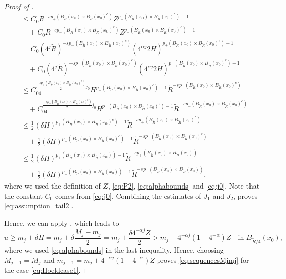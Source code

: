 \documentclass[11pt]{amsart}
\theoremstyle{plain}
\theoremstyle{definition}
\numberwithin{equation}{section}
\begin{document}
\begin{proof} [Proof of ]
\begin{equation}
\begin{aligned}
& \leq C_0R^{-sp_{+}(B_{\widetilde{R}}(x_0)\times B_{\widetilde{R}}(x_0)^c)}Z^{p_{+}(B_{\widetilde{R}}(x_0)\times B_{\widetilde{R}}(x_0)^c)-1} \\
& \quad + C_0R^{-sp_{-}(B_{\widetilde{R}}(x_0)\times B_{\widetilde{R}}(x_0)^c)}Z^{p_{-}(B_{\widetilde{R}}(x_0)\times B_{\widetilde{R}}(x_0)^c)-1} \\
& =C_0(4^{j}\widetilde{R})^{-sp_{+}(B_{\widetilde{R}}(x_0)\times B_{\widetilde{R}}(x_0)^c)}(4^{\alpha j}2H)^{p_{+}(B_{\widetilde{R}}(x_0)\times B_{\widetilde{R}}(x_0)^c)-1} \\
& \quad + C_0(4^{j}\widetilde{R})^{-sp_{-}(B_{\widetilde{R}}(x_0)\times B_{\widetilde{R}}(x_0)^c)}(4^{\alpha j}2H)^{p_{-}(B_{\widetilde{R}}(x_0)\times B_{\widetilde{R}}(x_0)^c)-1} \\
& \leq C_04^{\frac{-sp_{+}(B_{\widetilde{R}}(x_0)\times B_{\widetilde{R}}(x_0)^c)}{2}j_0}H^{p_{+}(B_{\widetilde{R}}(x_0)\times B_{\widetilde{R}}(x_0)^c)-1}\widetilde{R}^{-sp_{+}(B_{\widetilde{R}}(x_0)\times B_{\widetilde{R}}(x_0)^c)} \\
& \quad +C_04^{\frac{-sp_{-}(B_{\widetilde{R}}(x_0)\times B_{\widetilde{R}}(x_0)^c)}{2}j_0}H^{p_{-}(B_{\widetilde{R}}(x_0)\times B_{\widetilde{R}}(x_0)^c)-1}\widetilde{R}^{-sp_{-}(B_{\widetilde{R}}(x_0)\times B_{\widetilde{R}}(x_0)^c)} \\
& \leq \frac{1}{2}(\delta H)^{p_+(B_{\widetilde{R}}(x_0)\times B_{\widetilde{R}}(x_0)^c) - 1} \widetilde{R}^{-sp_+(B_{\widetilde{R}}(x_0)\times B_{\widetilde{R}}(x_0)^c)}\\
&\quad + \frac{1}{2}(\delta H)^{p_-(B_{\widetilde{R}}(x_0)\times B_{\widetilde{R}}(x_0)^c)-1} \widetilde{R}^{-sp_-(B_{\widetilde{R}}(x_0)\times B_{\widetilde{R}}(x_0)^c)} \\
& \leq \frac{1}{2}(\delta H)^{p_+(B_{\widetilde{R}}(x_0)\times B_{\widetilde{R}}(x_0)) - 1} \widetilde{R}^{-sp_+(B_{\widetilde{R}}(x_0)\times B_{\widetilde{R}}(x_0))} \\
&\quad +\frac{1}{2}(\delta H)^{p_-(B_{\widetilde{R}}(x_0)\times B_{\widetilde{R}}(x_0))-1} \widetilde{R}^{-sp_-(B_{\widetilde{R}}(x_0)\times B_{\widetilde{R}}(x_0))},
\end{aligned}
\end{equation}
where we used the definition of $Z$, \eqref{eq:P2}, \eqref{eq:alphabounds} and \eqref{eq:j0}. 
Note that the constant $C_0$ comes from \eqref{eq:j0}. Combining the estimates of $J_1$ and $J_2$, proves \eqref{eq:assumption_tail2}.

Hence, we can apply , which leads to
\[ u\geq m_j+\delta H = m_j+\delta \frac{M_{j}-m_j}{2} = m_j + \frac{\delta 4^{-\alpha j}Z}{2} > m_j+4^{-\alpha j}(1-4^{-\alpha})Z \quad \text{in } B_{\widetilde{R}/4}(x_0), \]
where we used \eqref{eq:alphabounds} in the last inequality. 
Hence, choosing $M_{j+1} = M_j$ and $m_{j+1}=m_j+4^{-\alpha j}(1-4^{-\alpha})Z$ proves \eqref{eq:sequencesMjmj} for the case \eqref{eq:Hoeldcase1}.


\end{proof}
\end{document}
